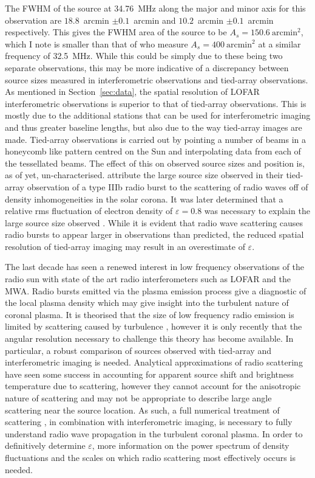 The FWHM of the source at 34.76~MHz along the major and minor axis for this observation are $18.8$~arcmin $\pm 0.1$~arcmin and $10.2$~arcmin $\pm 0.1$~arcmin respectively. This gives the FWHM area of the source to be $A_s = 150.6~\mbox{arcmin}^2$, which I note is smaller than that of \cite{Kontar2017} who measure $A_s = 400~\mbox{arcmin}^2$ at a similar frequency of 32.5~MHz. While this could be simply due to these being two separate observations, this may be more indicative of a discrepancy between source sizes measured in interferometric observations and tied-array observations.
As mentioned in Section~\ref{sec:data}, the spatial resolution of LOFAR interferometric observations is superior to that of tied-array observations. This is mostly due to the additional stations that can be used for interferometric imaging and thus greater baseline lengths, but also due to the way tied-array images are made. Tied-array observations is carried out by pointing a number of beams in a honeycomb like pattern centred on the Sun and interpolating data from each of the tessellated beams. The effect of this on observed source sizes and position is, as of yet, un-characterised. \cite{Kontar2017} attribute the large source size observed in their tied-array observation of a type IIIb radio burst to the scattering of radio waves off of density inhomogeneities in the solar corona. It was later determined that a relative rms fluctuation of electron density of $\varepsilon = 0.8$ was necessary to explain the large source size observed \cite{Kontar2019}. While it is evident that radio wave scattering causes radio bursts to appear larger in observations than predicted, the reduced spatial resolution of tied-array imaging may result in an overestimate of $\varepsilon$.

The last decade has seen a renewed interest in low frequency observations of the radio sun with state of the art radio interferometers such as LOFAR and the MWA. Radio bursts emitted via the plasma emission process give a diagnostic of the local plasma density which may give insight into the turbulent nature of coronal plasma. It is theorised that the size of low frequency radio emission is limited by scattering caused by turbulence \citep{Bastian1994}, however it is only recently that the angular resolution necessary to challenge this theory has become available. In particular, a robust comparison of sources observed with tied-array and interferometric imaging is needed. Analytical approximations of radio scattering \citep[e.g.][]{Chrysaphi2018,Gordovskyy2019,Sharma2020} have seen some success in accounting for apparent source shift and brightness temperature due to scattering, however they cannot account for the anisotropic nature of scattering and may not be appropriate to describe large angle scattering near the source location. As such, a full numerical treatment of scattering \citep[e.g.][]{Thejappa2008, Bian2019, Kontar2019}, in combination with interferometric imaging, is necessary to fully understand radio wave propagation in the turbulent coronal plasma. In order to definitively determine $\varepsilon$, more information on the power spectrum of density fluctuations and the scales on which radio scattering most effectively occurs is needed.

